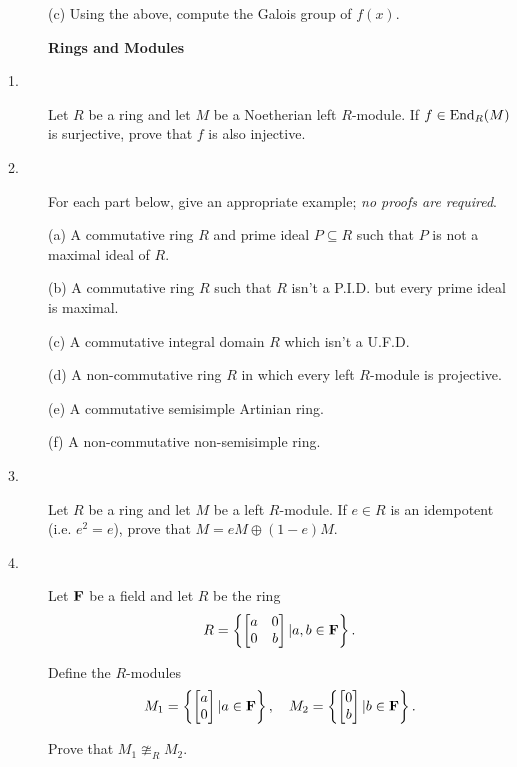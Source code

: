 \documentclass{article}
\begin{document}
\begin{description}
\item[\quad] (c)
Using the above, compute the Galois group of $f(x)$.

\centerline{{\bf Rings and Modules}}

\item[1.]
Let $R$ be a ring and let $M$ be a Noetherian left $R$-module. If
$f \in \hbox{End}_R (M)$ is surjective, prove that $f$ is also injective.

\item[2.]
For each part below, give an appropriate example; {\it no proofs are
required}.

\item[\quad] (a)
A commutative ring $R$ and prime ideal $P \subseteq R$ such that $P$ is not
a maximal ideal of $R$.

\item[\quad] (b)
A commutative ring $R$ such that $R$ isn't a P.I.D. but every prime ideal
is maximal.

\item[\quad] (c)
A commutative integral domain $R$ which isn't a U.F.D.

\item[\quad] (d)
A non-commutative ring $R$ in which every left $R$-module is projective.

\item[\quad] (e)
A commutative semisimple Artinian ring.

\item[\quad] (f)
A non-commutative non-semisimple ring.

\item[3.]
Let $R$ be a ring and let $M$ be a left $R$-module. If $e \in R$ is an
idempotent (i.e. $e^2 = e$), prove that $M = eM \oplus (1-e)M$.

\item[4.]
Let ${\bf F}$ be a field and let $R$ be the ring
$$R = \left\{ \left[ \begin{matrix} a&0 \\ 0&b \end{matrix} \right] |
  a, b \in {\bf F} \right\}.$$

Define the $R$-modules
$$M_1 = \left\{ \left[ \begin{matrix} a \\ 0 \end{matrix} \right] |
  a \in {\bf F} \right\}, \quad M_2 = \left\{ \left[
  \begin{matrix} 0 \\ b \end{matrix} \right] | b \in {\bf F} \right\}.$$

Prove that $M_1 \ncong_R M_2$.


\end{description}    
\end{document}
